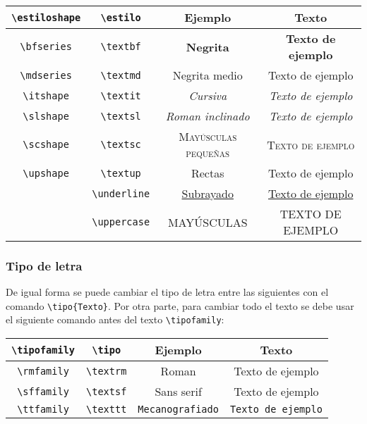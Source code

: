 	\begin{center}
		\begin{tabular}[c]{|c|c|c|c|}
			\hline
			\verb|\estiloshape| & \verb|\estilo| & Ejemplo & Texto\\
			\hline
			\verb|\bfseries| & \verb|\textbf| & \textbf{Negrita} & \textbf{Texto de ejemplo}\\	
			\verb|\mdseries| & \verb|\textmd| & \textmd{Negrita medio} & \textmd{Texto de ejemplo}\\		
			\verb|\itshape| & \verb|\textit| & \textit{Cursiva} & \textit{Texto de ejemplo}\\	
			\verb|\slshape| & \verb|\textsl| & \textsl{Roman inclinado} & \textsl{Texto de ejemplo}\\	
			\verb|\scshape| & \verb|\textsc| & \textsc{Mayúsculas pequeñas} & \textsc{Texto de ejemplo}\\	
			\verb|\upshape| & \verb|\textup| & \textup{Rectas} & \textup{Texto de ejemplo}\\	
			& \verb|\underline| & \underline{Subrayado} & \underline{Texto de ejemplo}\\			
			& \verb|\uppercase| & \uppercase{Mayúsculas} & \uppercase{Texto de ejemplo}\\	
			\hline	
		\end{tabular}
	\end{center}
	
	
	\subsubsection{Tipo de letra}
	
	De igual forma se puede cambiar el tipo de letra entre las siguientes con el comando \verb|\tipo{Texto}|. Por otra parte, para cambiar todo el texto se debe usar el siguiente comando antes del texto \verb|\tipofamily|:
	
	\begin{center}
		\begin{tabular}[c]{|c|c|c|c|}
			\hline
			\verb|\tipofamily| & \verb|\tipo| & Ejemplo & Texto\\
			\hline
			\verb|\rmfamily| &\verb|\textrm| & \textrm{Roman} & \textrm{Texto de ejemplo}\\		
			\verb|\sffamily| &\verb|\textsf| & \textsf{Sans serif} & \textsf{Texto de ejemplo}\\		
			\verb|\ttfamily| &\verb|\texttt| & \texttt{Mecanografiado} & \texttt{Texto de ejemplo}\\		
			\hline	
		\end{tabular}
	\end{center}
	
